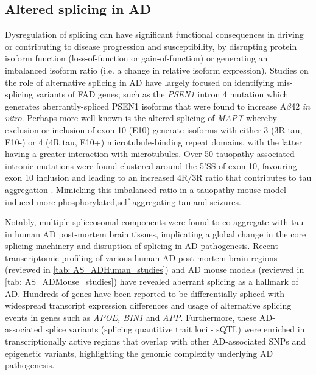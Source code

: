 \newpage
\subsection{Altered splicing in AD}\label{intro:AD_alteredsplicing}
Dysregulation of splicing can have significant functional consequences in driving or contributing to disease progression and susceptibility, by disrupting protein isoform function (loss-of-function or gain-of-function) or generating an imbalanced isoform ratio (i.e. a change in relative isoform expression). Studies on the role of alternative splicing in AD have largely focused on identifying mis-splicing variants of FAD genes; such as the \textit{PSEN1} intron 4 mutation which generates aberrantly-spliced PSEN1 isoforms that were found to increase A$\beta$42 \textit{in vitro}\cite{DeJonghe1999}. Perhaps more well known is the altered splicing of \textit{MAPT} whereby exclusion or inclusion of exon 10 (E10) generate isoforms with either 3 (3R tau, E10-) or 4 (4R tau, E10+) microtubule-binding repeat domains, with the latter having a greater interaction with microtubules. Over 50 tauopathy-associated intronic mutations were found clustered around the 5'SS of exon 10, favouring exon 10 inclusion \cite{DSouza1999, Ghetti2015} and leading to an increased 4R/3R ratio that contributes to tau aggregation \cite{Adams2010}. Mimicking this imbalanced ratio in a tauopathy mouse model induced more phosphorylated,self-aggregating tau and seizures\cite{Schoch2016}.  

Notably, multiple spliceosomal components were found to co-aggregate with tau in human AD post-mortem brain tissues\cite{Bai2013}, implicating a global change in the core splicing machinery and disruption of splicing in AD pathogenesis. Recent transcriptomic profiling of various human AD post-mortem brain regions (reviewed in \cref{tab: AS_ADHuman_studies}) and AD mouse models (reviewed in \cref{tab: AS_ADMouse_studies}) have revealed aberrant splicing as a hallmark of AD. Hundreds of genes have been reported to be differentially spliced with widespread transcript expression differences and usage of alternative splicing events in genes such as \textit{APOE, BIN1} and \textit{APP}\cite{Marques-Coelho2021, Raj2018}. Furthermore, these AD-associated splice variants (splicing quantitive trait loci - sQTL) were enriched in transcriptionally active regions that overlap with other AD-associated SNPs and epigenetic variants, highlighting the genomic complexity underlying AD pathogenesis.  


